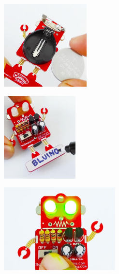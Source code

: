 \documentclass[a4paper]{article}
\begin{document}
\begin{minipage}[t]{0.33\textwidth}
  \centering
  \includegraphics[height=4.5cm]{../pictures/Knopfzelle.jpg}
  \label{img:Knopfzelle}
  \end{minipage}
\begin{minipage}[t]{0.33\textwidth}
  \centering
  \includegraphics[height=4.5cm]{../pictures/Name.jpg}
  \label{img:Name}
\end{minipage}
\begin{minipage}[t]{0.33\textwidth}
  \centering
  \includegraphics[height=4.5cm]{../pictures/Switchon.jpg}
  \label{img:Switchon}
\end{minipage}
\ \\
\end{document}
